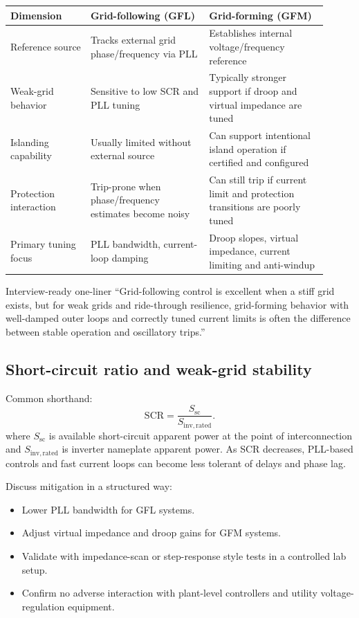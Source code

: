 \documentclass[11pt]{article}
\begin{document}
\begin{table}[h]
\centering
\begin{tabular}{p{0.23\linewidth}p{0.34\linewidth}p{0.34\linewidth}}
\toprule
Dimension & Grid-following (GFL) & Grid-forming (GFM) \\
\midrule
Reference source & Tracks external grid phase/frequency via PLL & Establishes internal voltage/frequency reference \\
Weak-grid behavior & Sensitive to low SCR and PLL tuning & Typically stronger support if droop and virtual impedance are tuned \\
Islanding capability & Usually limited without external source & Can support intentional island operation if certified and configured \\
Protection interaction & Trip-prone when phase/frequency estimates become noisy & Can still trip if current limit and protection transitions are poorly tuned \\
Primary tuning focus & PLL bandwidth, current-loop damping & Droop slopes, virtual impedance, current limiting and anti-windup \\
\bottomrule
\end{tabular}
\end{table}

\begin{answerbox}{Interview-ready one-liner}
``Grid-following control is excellent when a stiff grid exists, but for weak
grids and ride-through resilience, grid-forming behavior with well-damped outer
loops and correctly tuned current limits is often the difference between stable
operation and oscillatory trips.''
\end{answerbox}

\subsection{Short-circuit ratio and weak-grid stability}
Common shorthand:
\[
\mathrm{SCR} = \frac{S_{\mathrm{sc}}}{S_{\mathrm{inv,rated}}}.
\]
where \(S_{\mathrm{sc}}\) is available short-circuit apparent power at the
point of interconnection and \(S_{\mathrm{inv,rated}}\) is inverter nameplate
apparent power. As SCR decreases, PLL-based controls and fast current loops can
become less tolerant of delays and phase lag.

Discuss mitigation in a structured way:
\begin{itemize}
  \item Lower PLL bandwidth for GFL systems.
  \item Adjust virtual impedance and droop gains for GFM systems.
  \item Validate with impedance-scan or step-response style tests in a controlled lab setup.
  \item Confirm no adverse interaction with plant-level controllers and utility voltage-regulation equipment.
\end{itemize}
\end{document}
